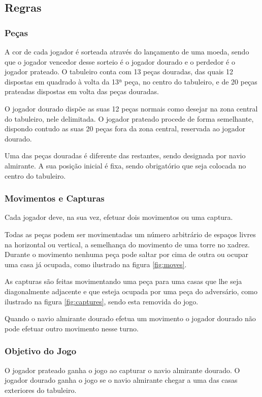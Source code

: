 \documentclass[a4paper]{article}
\begin{document}
\subsection{Regras}
\subsubsection{Peças}
A cor de cada jogador é sorteada através do lançamento de uma moeda, sendo que o jogador vencedor desse sorteio é o jogador dourado e o perdedor é o jogador prateado. O tabuleiro conta com 13 peças douradas, das quais 12 dispostas em quadrado à volta da 13ª peça, no centro do tabuleiro, e de 20 peças prateadas dispostas em volta das peças douradas.

O jogador dourado dispõe as suas 12 peças normais como desejar na zona central do tabuleiro, nele delimitada. O jogador prateado procede de forma semelhante, dispondo contudo as suas 20 peças fora da zona central, reservada ao jogador dourado.

Uma das peças douradas é diferente das restantes, sendo designada por navio almirante. A sua posição inicial é fixa, sendo obrigatório que seja colocada no centro do tabuleiro.

\subsubsection{Movimentos e Capturas}
Cada jogador deve, na sua vez, efetuar dois movimentos ou uma captura. 

Todas as peças podem ser movimentadas um número arbitrário de espaços livres na horizontal ou vertical, a semelhança do movimento de uma torre no xadrez. Durante o movimento nenhuma peça pode saltar por cima de outra ou ocupar uma casa já ocupada, como ilustrado na figura \ref{fig:moves}.

As capturas são feitas movimentando uma peça para uma casas que lhe seja diagonalmente adjacente e que esteja ocupada por uma peça do adversário, como ilustrado na figura \ref{fig:captures}, sendo esta removida do jogo.

Quando o navio almirante dourado efetua um movimento o jogador dourado não pode efetuar outro movimento nesse turno.

\subsubsection{Objetivo do Jogo}
O jogador prateado ganha o jogo ao capturar o navio almirante dourado. O jogador dourado ganha o jogo se o navio almirante chegar a uma das casas exteriores do tabuleiro.
\end{document}
